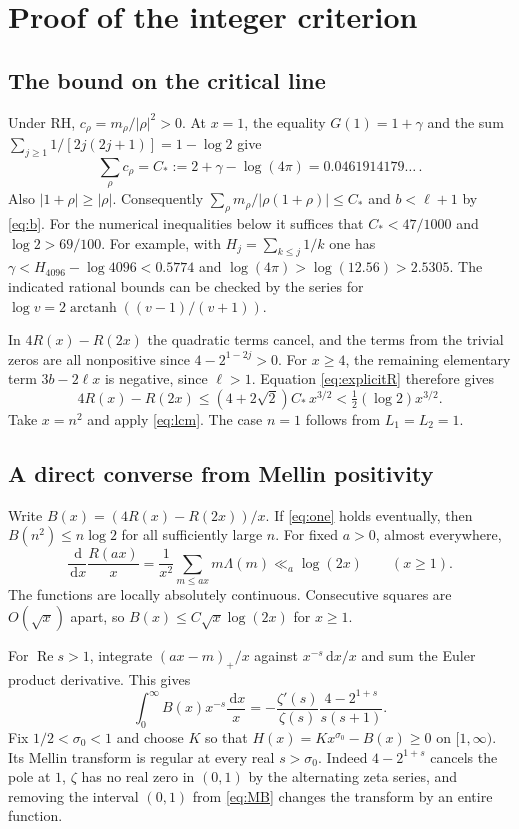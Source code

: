 \documentclass[11pt,a4paper]{article}
\newcommand{\dd}{\,\mathrm d}
\newcommand{\Rea}{\operatorname{Re}}
\begin{document}
\section{Proof of the integer criterion}\label{sec:lcm}
\subsection*{The bound on the critical line}
Under RH, $c_\rho=m_\rho/|\rho|^2>0$. At $x=1$, the equality $G(1)=1+\gamma$ and the sum $\sum_{j\ge1}1/[2j(2j+1)]=1-\log2$ give
\begin{equation}\label{eq:cstar}
 \sum_\rho c_\rho=C_*:=2+\gamma-\log(4\pi)=0.0461914179\ldots\, .
\end{equation}
Also $|1+\rho|\ge |\rho|$. Consequently $\sum_\rho m_\rho/|\rho(1+\rho)|\le C_*$ and $b<\ell+1$ by \eqref{eq:b}. For the numerical inequalities below it suffices that $C_*<47/1000$ and $\log2>69/100$. For example, with $H_j=\sum_{k\le j}1/k$ one has $\gamma<H_{4096}-\log4096<0.5774$ and $\log(4\pi)>\log(12.56)>2.5305$. The indicated rational bounds can be checked by the series for $\log v=2\operatorname{arctanh}((v-1)/(v+1))$.

In $4R(x)-R(2x)$ the quadratic terms cancel, and the terms from the trivial zeros are all nonpositive since $4-2^{1-2j}>0$. For $x\ge4$, the remaining elementary term $3b-2\ell x$ is negative, since $\ell>1$. Equation \eqref{eq:explicitR} therefore gives
\begin{equation}\label{eq:forward}
 4R(x)-R(2x)\le (4+2\sqrt2)C_*\,x^{3/2}
                    <\tfrac12(\log2)x^{3/2}.
\end{equation}
Take $x=n^2$ and apply \eqref{eq:lcm}. The case $n=1$ follows from $L_1=L_2=1$.

\subsection*{A direct converse from Mellin positivity}
Write $B(x)=(4R(x)-R(2x))/x$. If \eqref{eq:one} holds eventually, then $B(n^2)\le n\log2$ for all sufficiently large $n$. For fixed $a>0$, almost everywhere,
\begin{equation}\label{eq:slope}
 \frac{\dd}{\dd x}\frac{R(ax)}{x}
   =\frac{1}{x^2}\sum_{m\le ax}m\Lambda(m)\ll_a\log(2x)
   \qquad(x\ge1).
\end{equation}
The functions are locally absolutely continuous. Consecutive squares are $O(\sqrt x)$ apart, so $B(x)\le C\sqrt{x}\log(2x)$ for $x\ge1$.

For $\Rea s>1$, integrate $(ax-m)_+/x$ against $x^{-s}\dd x/x$ and sum the Euler product derivative. This gives
\begin{equation}\label{eq:MB}
 \int_0^\infty B(x)x^{-s}\frac{\dd x}{x}
  =-\frac{\zeta'(s)}{\zeta(s)}\frac{4-2^{1+s}}{s(s+1)}.
\end{equation}
Fix $1/2<\sigma_0<1$ and choose $K$ so that $H(x)=Kx^{\sigma_0}-B(x)\ge0$ on $[1,\infty)$. Its Mellin transform is regular at every real $s>\sigma_0$. Indeed $4-2^{1+s}$ cancels the pole at $1$, $\zeta$ has no real zero in $(0,1)$ by the alternating zeta series, and removing the interval $(0,1)$ from \eqref{eq:MB} changes the transform by an entire function.
\end{document}
